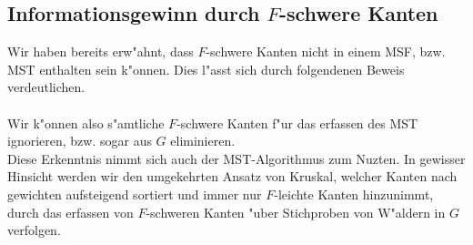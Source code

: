\subsection{Informationsgewinn durch $F$-schwere Kanten}

Wir haben bereits erw"ahnt, dass $F$-schwere Kanten nicht in einem MSF, bzw. MST
    enthalten sein k"onnen. 
    Dies l"asst sich durch folgendenen Beweis verdeutlichen.\\
\\
Wir k"onnen also s"amtliche $F$-schwere Kanten f"ur das erfassen des MST 
    ignorieren, bzw. sogar aus $G$ eliminieren.\\
Diese Erkenntnis nimmt sich auch der MST-Algorithmus zum Nuzten. In gewisser
    Hinsicht werden wir den umgekehrten Ansatz von Kruskal, welcher Kanten nach
    gewichten aufsteigend sortiert und immer nur $F$-leichte Kanten hinzunimmt,
    durch das erfassen von $F$-schweren Kanten "uber Stichproben von W"aldern
    in $G$ verfolgen.\\
